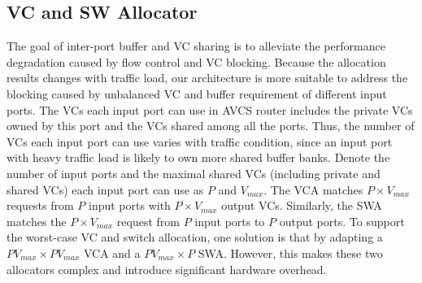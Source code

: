 \documentclass[10pt,conference]{IEEEtran}
\begin{document}
\subsection{VC and SW Allocator}\label{allocmux}
The goal of inter-port buffer and VC sharing is to alleviate the performance degradation caused by flow control and VC blocking. Because the allocation results changes with traffic load, our architecture is more suitable to address the blocking caused by unbalanced VC and buffer requirement of different input ports. The VCs each input port can use in AVCS router includes the private VCs owned by this port and the VCs shared among all the ports. Thus, the number of VCs each input port can use varies with traffic condition, since an input port with heavy traffic load is likely to own more shared buffer banks. Denote the number of input ports and the maximal shared VCs (including private and shared VCs) each input port can use as $P$ and $V_{max}$. The VCA matches $P\times V_{max}$ requests from $P$ input ports with $P\times V_{max}$ output VCs. Similarly, the SWA matches the $P\times V_{max}$ request from $P$ input ports to $P$ output ports. To support the worst-case VC and switch allocation, one solution is that by adapting a $PV_{max}\times PV_{max}$ VCA and a $PV_{max}\times P$ SWA. However, this makes these two allocators complex and introduce significant hardware overhead.

\end{document}
